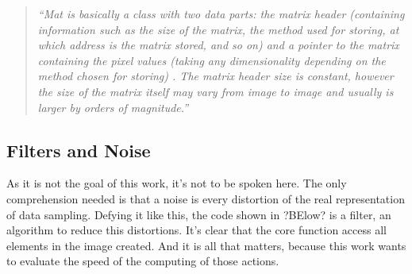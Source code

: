         \begin{quotation}
        
        \emph{
        ``Mat is basically a class with two data parts: the matrix header (containing information such as the size of the matrix, the method used for storing, at which address is the matrix stored, and so on) and a pointer to the matrix containing the pixel values (taking any dimensionality depending on the method chosen for storing) . The matrix header size is constant, however the size of the matrix itself may vary from image to image and usually is larger by orders of magnitude.''}   
        \end{quotation}

    \subsection{Filters and Noise}
        As it is not the goal of this work, it's not to be spoken here. The only comprehension needed is that a noise is every distortion of the real representation of data sampling. Defying it like this, the code shown in ?BElow? is a filter, an algorithm to reduce this distortions. It's clear that the core function access all elements in the image created. And it is all that matters, because this work wants to evaluate the speed of the computing of those actions.
